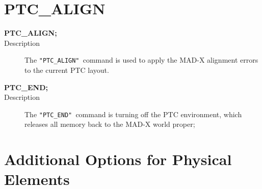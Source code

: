 \section{PTC\_ALIGN}

\begin{description}
   \item[\textbf{PTC\_ALIGN;}] 
   \item[Description] 
     The \texttt{"PTC\_ALIGN" }command is used to apply the MAD-X
     alignment  errors to the current PTC layout. 
\end{description}

\begin{description}
   \item[\textbf{PTC\_END;}] 
   \item[Description] 
     The \texttt{"PTC\_END" }command  is turning off the PTC
     environment,  which releases all memory back to the MAD-X world
     proper; 
\end{description}

\section{Additional Options for Physical Elements}

